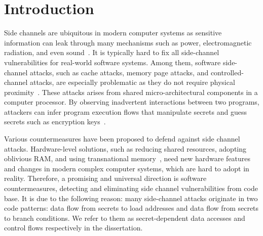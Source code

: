 
\chapter{Introduction} \label{chapter1}
Side channels are ubiquitous in modern computer systems as sensitive
information can leak through many mechanisms such as power,
electromagnetic radiation, and even sound~\cite{agrawal2002side,kar20178,chari1999towards,217605,genkin2014rsa}.
It is typically hard to fix all side-channel vulnerabilities for real-world software systems. Among them, software side-channel attacks, such as cache attacks, memory page attacks, and controlled-channel attacks, are especially problematic as they do not require physical proximity~\cite{7163052,217543,217589,lee2017inferring,191010,liu2015last}. These attacks arises from shared micro-architectural components in a computer processor. By observing inadvertent interactions between two programs, attackers can infer program execution flows that manipulate secrets and guess secrets such as encryption keys~\cite{Osvik2006,Gullasch:2011:CGB:2006077.2006784,203878,10.1007/978-3-540-45238-6_6}.

Various countermeasures have been proposed to defend against
side channel attacks. Hardware-level solutions, such as reducing shared
resources, adopting oblivious RAM, and using transnational
memory~\cite{203878,217537,shih2017t,Zhang:2015:HDL:2775054.2694372}, need new
hardware features and changes in modern complex computer systems, which are
hard to adopt in reality. Therefore, a promising and universal direction is software countermeasures, detecting and eliminating side channel vulnerabilities from code base. It is due to the following reason: many side-channel attacks originate in two code patterns: data flow from secrets to load addresses and data flow from secrets to branch conditions. We refer to them as secret-dependent data accesses and control flows respectively in the dissertation. 

